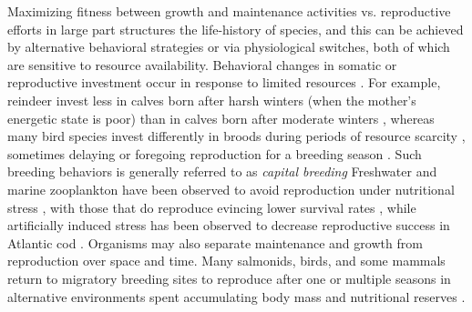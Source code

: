 \documentclass[12pt,english]{article}
\begin{document}
\begin{spacing}{1.9}
Maximizing fitness between growth and maintenance activities vs. reproductive efforts in large part structures the life-history of species, and this can be achieved by alternative behavioral strategies or via physiological switches, both of which are sensitive to resource availability.
Behavioral changes in somatic or reproductive investment occur in response to limited resources \citep{Morris:1987eo}.
For example, reindeer invest less in calves born after harsh winters (when the mother's energetic state is poor) than in calves born after moderate winters \citep{Tveraa:2003fq}, whereas many bird species invest differently in broods during periods of resource scarcity \citep{Daan:1988va,Jacot:2009dv}, sometimes delaying or foregoing reproduction for a breeding season \citep{Martin:1987dl,Barboza:2002in}.
Such breeding behaviors is generally referred to as \emph{capital breeding}
Freshwater and marine zooplankton have been observed to avoid reproduction under nutritional stress \citep{Threlkeld:1976ih}, with those that do reproduce evincing lower survival rates \citep{Kirk:1997cc}, while artificially induced stress has been observed to decrease reproductive success in Atlantic cod \citep{Morgan:1999do}.
Organisms may also separate maintenance and growth from reproduction over space and time. 
Many salmonids, birds, and some mammals return to migratory breeding sites to reproduce after one or multiple seasons in alternative environments spent accumulating body mass and nutritional reserves \citep{Weber:1998jg,Mduma:1999cp,Moore:2014hi}.



\end{spacing}
\end{document}
